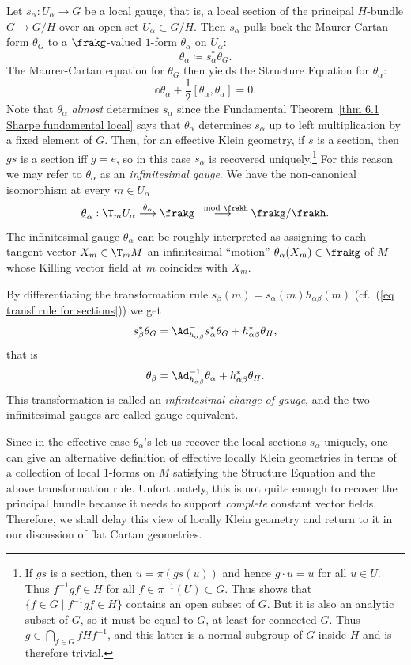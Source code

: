 Let $ s_\alpha:U_\alpha\to G$ be a local gauge, that is, a local section of the principal $H$-bundle $G\to G\slash H$ over an open set $U_\alpha\subset G\slash H$. Then $ s_\alpha$ pulls back the Maurer-Cartan form $\theta_G$ to a $\frakg$-valued $1$-form $\theta_\alpha$ on $U_\alpha$: \[\theta_\alpha\coloneqq  s_\alpha^\ast\theta_G.\] 
The Maurer-Cartan equation for $\theta_G$ then yields the Structure Equation for $\theta_\alpha$:
\[\dd\theta_\alpha+\frac 12[\theta_\alpha,\theta_\alpha]=0.\]
Note that $\theta_\alpha$ \emph{almost} determines $ s_\alpha$ since the Fundamental Theorem~\ref{thm 6.1 Sharpe fundamental local} says that $\theta_\alpha$ determines $ s_\alpha$ up to left multiplication by a fixed element of $G$. Then, for an effective Klein geometry, if $ s$ is a section, then $g s$ is a section iff $g=e$, so in this case $ s_\alpha$ is recovered uniquely.\footnote{If $g s$ is a section, then $u=\pi(g s(u))$ and hence $g\cdot u=u$ for all $u\in U$. Thus $f^{-1}gf\in H$ for all $f\in\pi^{-1}(U)\subset G$. Thus shows that $\{f\in G\mid f^{-1}gf\in H\}$ contains an open subset of $G$. But it is also an analytic subset of $G$, so it must be equal to $G$, at least for connected $G$. Thus $g\in \bigcap_{f\in G}fHf^{-1}$, and this latter is a normal subgroup of $G$ inside $H$ and is therefore trivial.} 
For this reason we may refer to $\theta_\alpha$ as an \emph{infinitesimal gauge}. We have the non-canonical isomorphism at every $m\in U_\alpha$
\[\underline{\theta}_\alpha:\T_mU_\alpha\overset{\theta_\alpha}{\longrightarrow}\frakg\overset{\mod\frakh}{\longrightarrow} \frakg\slash\frakh.\]
The infinitesimal gauge $\theta_\alpha$ can be roughly interpreted as assigning to each tangent vector $X_m\in \T_mM$ an infinitesimal ``motion'' $\theta_\alpha(X_m)\in \frakg$ of $M$ whose Killing vector field at $m$ coincides with $X_m$.

By differentiating the transformation rule $ s_\beta(m)= s_\alpha(m)h_{\alpha\beta}(m)$ (cf.\ (\ref{eq transf rule for sections})) we get
\[ s_\beta^{\ast}\theta_G=\Ad_{h_{\alpha\beta}}^{-1} s_\alpha^\ast\theta_G+h_{\alpha\beta}^\ast\theta_H,\]
that is
\[\theta_\beta=\Ad_{h_{\alpha\beta}}^{-1}\theta_\alpha+h_{\alpha\beta}^\ast\theta_H.\]
This transformation is called an \emph{infinitesimal change of gauge}, and the two infinitesimal gauges are called gauge equivalent.

Since in the effective case $\theta_\alpha$'s let us recover the local sections $s_\alpha$ uniquely, one can give an alternative definition of effective locally Klein geometries in terms of a collection of local $1$-forms on $M$ satisfying the Structure Equation and the above transformation rule. Unfortunately, this is not quite enough to recover the principal bundle because it needs to support \emph{complete} constant vector fields. Therefore, we shall delay this view of locally Klein geometry and return to it in our discussion of flat Cartan geometries. 

